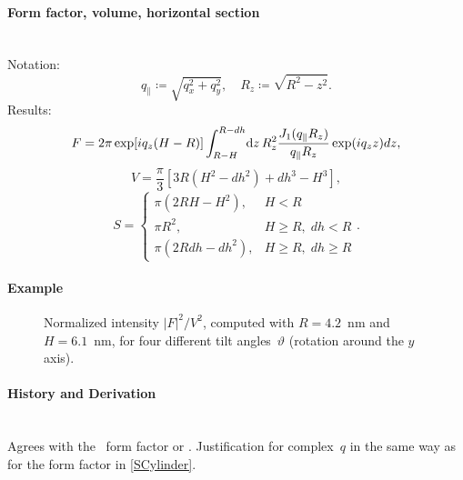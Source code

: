 \paragraph{Form factor, volume, horizontal section}\strut\\
Notation:
\begin{equation*}
  q_{\parallel} \coloneqq \sqrt{q_x^2+q_y^2},\quad
  R_z \coloneqq \sqrt{R^2-z^2}.
\end{equation*}
Results:
\begin{equation*}
F= 2\pi \exp[i q_z (H-R)]\int_{R-H}^{R-dh}\!\mathrm d z\, R_z^2
       \frac{J_1(q_{\parallel} R_z) }{q_{\parallel} R_z} \exp(i q_z z) dz,
\end{equation*}
\begin{equation*}
  V=\frac{\pi}{3} \left[ 3R\left(H^2-dh^2\right) +dh^3 - H^3 \right],
\end{equation*}
\begin{equation*}
  S = \left\{\begin{array}{ll} \pi\left(2RH-H^2\right), & H < R \\
                               \pi R^2, & H \geq R,\; dh < R \\
                               \pi\left(2Rdh-dh^2\right), & H \geq R,\; dh \geq R
                                 \end{array}\right..
\end{equation*}

\paragraph{Example}\strut

\begin{figure}[H]
\begin{center}
\end{center}
\caption{Normalized intensity $|F|^2/V^2$,
computed with $R=4.2$~nm and $H=6.1$~nm,
for four different tilt angles~$\vartheta$ (rotation around the $y$ axis).}
\end{figure}

\paragraph{History and Derivation}\strut\\
Agrees with the \IsGISAXS\ form factor
 \cite[Eq.~2.33]{Laz06} or
 \cite[Eq.~228]{ReLL09}.
Justification for complex~$q$ in the same way as for the  form factor
in \cref{SCylinder}.


